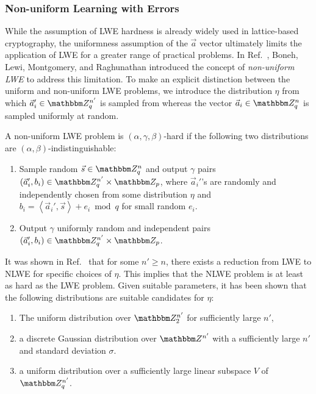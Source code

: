 \subsubsection{Non-uniform Learning with Errors}
While the assumption of LWE hardness is already widely used in lattice-based cryptography, the uniformness assumption of the $\vec{a}$ vector ultimately limits the application of LWE for a greater range of practical problems.
In Ref.~\cite{boneh2013key}, Boneh, Lewi, Montgomery, and Raghunathan introduced the concept of \emph{non-uniform LWE} to address this limitation.
To make an explicit distinction between the uniform and non-uniform LWE problems, we introduce the distribution $\eta$ from which $\vec{a}_i' \in \Z_q^{n'}$ is sampled from whereas the vector $\vec{a}_i \in \Z_q^n$ is sampled uniformly at random. 

\begin{definition}
	A non-uniform LWE problem is $(\alpha, \gamma, \beta)$-hard if the following two distributions are $(\alpha, \beta)$-indistinguishable:
	\begin{enumerate}
		\item Sample random $\vec{s} \in \Z_q^n$ and output $\gamma$ pairs $\left(\vec{a}_i', b_i\right) \in \Z_q^{n'} \times \Z_p$, where $\vec{a}_i'$'s are randomly and independently chosen from some distribution $\eta$ and $b_i = \left\langle \vec{a}_i', \vec{s}\right\rangle + e_i \bmod q$ for small random $e_i$.
		\item Output $\gamma$ uniformly random and independent pairs $\left(\vec{a}_i', b_i\right) \in \Z_q^{n'} \times \Z_p$.
	\end{enumerate}
\end{definition}

It was shown in Ref.~\cite{boneh2013key} that for some $n' \geq n$, there exists a reduction from LWE to NLWE for specific choices of $\eta$.
This implies that the NLWE problem is at least as hard as the LWE problem.
Given suitable parameters, it has been shown that the following distributions are suitable candidates for $\eta$:
\begin{enumerate}
	\item The uniform distribution over $\Z_2^{n'}$ for sufficiently large $n'$,
	\item a discrete Gaussian distribution over $\Z^{n'}$ with a sufficiently large $n'$ and standard deviation $\sigma$.
	\item a uniform distribution over a sufficiently large linear subspace $V$ of $\Z_q^{n'}$.
\end{enumerate}



